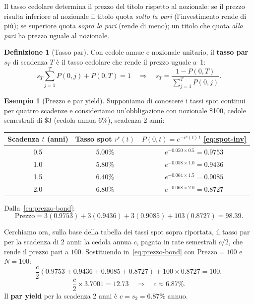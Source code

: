 \documentclass[11pt,a4paper]{article}
\theoremstyle{plain}
\theoremstyle{definition}
\newtheorem{definizione}[teorema]{Definizione}
\newtheorem{esempio}[teorema]{Esempio}
\theoremstyle{remark}
\begin{document}
Il tasso cedolare determina il prezzo del titolo rispetto al nozionale: se il prezzo risulta
inferiore al nozionale il titolo quota \emph{sotto la pari} (l'investimento rende di pi\`u); se
superiore quota \emph{sopra la pari} (rende di meno); un titolo che quota \emph{alla pari} ha
prezzo uguale al nozionale.
\begin{definizione}[Tasso par]
\label{def:par}
Con cedole annue e nozionale unitario, il \textbf{tasso par} $s_T$ di scadenza $T$ \`e
il tasso cedolare che rende il prezzo uguale a~1:
\begin{equation}
  \label{eq:tasso_par}
  s_T \sum_{j=1}^{T} P(0,j) + P(0,T) = 1
  \quad\Longrightarrow\quad
  s_T = \frac{1 - P(0,T)}{\displaystyle\sum_{j=1}^{T} P(0,j)}.
\end{equation}
\end{definizione}
\begin{esempio}[Prezzo e par yield]%
\label{ex:hull42}
Supponiamo di conoscere i tassi spot continui per quattro scadenze e consideriamo un'obbligazione con nozionale \$100, cedole semestrali di \$3 (cedola
annua 6\%), scadenza 2 anni:
\begin{center}\small
\renewcommand{\arraystretch}{1.2}
\begin{tabular}{ccc}
\toprule
Scadenza $t$ (anni) & Tasso spot $r^c(t)$ & $P(0,t) = e^{-r^c(t)\,t}$ \eqref{eq:spot-inv} \\
\midrule
0.5 & 5.00\% & $e^{-0.050\times 0.5} = 0.9753$ \\
1.0 & 5.80\% & $e^{-0.058\times 1.0} = 0.9436$ \\
1.5 & 6.40\% & $e^{-0.064\times 1.5} = 0.9085$ \\
2.0 & 6.80\% & $e^{-0.068\times 2.0} = 0.8727$ \\
\bottomrule
\end{tabular}
\end{center}

 Dalla~\eqref{eq:prezzo-bond}:
\[
  \text{Prezzo}
  = 3(0.9753) + 3(0.9436) + 3(0.9085) + 103(0.8727)
  = 98.39.
\]

Cerchiamo ora, sulla base della tabella dei tassi spot sopra riportata, il tasso par per la
scadenza di 2 anni: la cedola annua $c$, pagata in rate semestrali $c/2$, che rende il
prezzo pari a $100$. %
Sostituendo in~\eqref{eq:prezzo-bond} con $\text{Prezzo}=100$ e $N=100$:
\[
  \frac{c}{2}(0.9753 + 0.9436 + 0.9085 + 0.8727) + 100\times 0.8727 = 100,
\]
\[
  \frac{c}{2}\times 3.7001 = 12.73
  \quad\Longrightarrow\quad
  c \approx 6.87\%.
\]
Il \textbf{par yield} per la scadenza 2 anni \`e $c = s_2 = 6.87\%$ annuo.%
\end{esempio}
\end{document}
